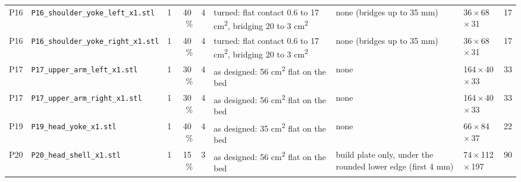 {\begin{longtable}{@{}lP{45mm}rrrP{25mm}P{25mm}P{21mm}r@{}}
P16 & {\scriptsize\nolinkurl{P16_shoulder_yoke_left_x1.stl}} & 1 & 40\,\% & 4 & turned: flat contact 0.6 to 17 cm\textsuperscript{2}, bridging 20 to 3 cm\textsuperscript{2} & none (bridges up to 35 mm) & 36\,$\times$\,68\,$\times$\,31 & 17\\
P16 & {\scriptsize\nolinkurl{P16_shoulder_yoke_right_x1.stl}} & 1 & 40\,\% & 4 & turned: flat contact 0.6 to 17 cm\textsuperscript{2}, bridging 20 to 3 cm\textsuperscript{2} & none (bridges up to 35 mm) & 36\,$\times$\,68\,$\times$\,31 & 17\\
P17 & {\scriptsize\nolinkurl{P17_upper_arm_left_x1.stl}} & 1 & 30\,\% & 4 & as designed: 56 cm\textsuperscript{2} flat on the bed & none & 164\,$\times$\,40\,$\times$\,33 & 33\\
P17 & {\scriptsize\nolinkurl{P17_upper_arm_right_x1.stl}} & 1 & 30\,\% & 4 & as designed: 56 cm\textsuperscript{2} flat on the bed & none & 164\,$\times$\,40\,$\times$\,33 & 33\\
P19 & {\scriptsize\nolinkurl{P19_head_yoke_x1.stl}} & 1 & 40\,\% & 4 & as designed: 35 cm\textsuperscript{2} flat on the bed & none & 66\,$\times$\,84\,$\times$\,37 & 22\\
P20 & {\scriptsize\nolinkurl{P20_head_shell_x1.stl}} & 1 & 15\,\% & 3 & as designed: 56 cm\textsuperscript{2} flat on the bed & build plate only, under the rounded lower edge (first 4 mm) & 74\,$\times$\,112\,$\times$\,197 & 90\\
\bottomrule
\end{longtable}}
